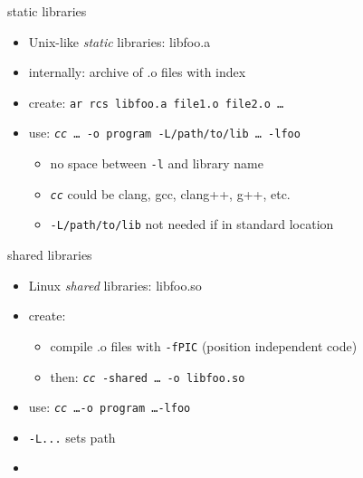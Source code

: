 \begin{frame}{static libraries}
    \begin{itemize}
    \item Unix-like \textit{static} libraries: libfoo.a
    \item internally: archive of .o files with index
    \item create: \texttt{ar rcs libfoo.a file1.o file2.o \ldots}
    \item use: \texttt{\textit{cc} \ldots~-o program -L/path/to/lib \ldots~-lfoo}
        \begin{itemize}
        \item no space between \texttt{-l} and library name
        \item \texttt{\textit{cc}} could be clang, gcc, clang++, g++, etc.
        \item \texttt{-L/path/to/lib} not needed if in standard location
        \end{itemize}
    \end{itemize}
\end{frame}

\begin{frame}{shared libraries}
    \begin{itemize}
    \item Linux \textit{shared} libraries: libfoo.so
    \item create:
        \begin{itemize}
        \item compile .o files with \texttt{-fPIC} (position independent code)
        \item then: \texttt{\textit{cc} -shared \ldots~-o libfoo.so}
        \end{itemize}
    \item use: \texttt{\textit{cc} \ldots -o program  \ldots -lfoo}
    \vspace{.5cm}
    \item<2-> \texttt{-L...} sets path \textit{}
    \item<2-> 
    \end{itemize}
\end{frame}

